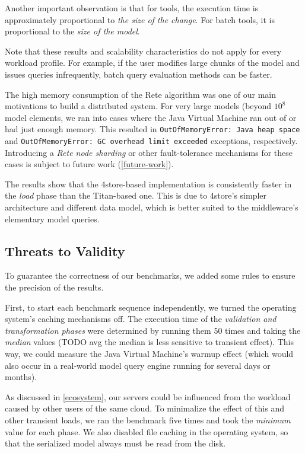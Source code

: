 Another important observation is that for \iqd{} tools, the execution time is approximately proportional to \emph{the size of the change}. For batch tools, it is proportional to the \emph{size of the model}. 

Note that these results and scalability characteristics do not apply for every workload profile. For example, if the user modifies large chunks of the model and issues queries infrequently, batch query evaluation methods can be faster. 

The high memory consumption of the Rete algorithm was one of our main motivations to build a distributed system. For very large models (beyond $10^8$ model elements, we ran into cases where the Java Virtual Machine ran out of or had just enough memory. This resulted in \texttt{OutOfMemoryError: Java heap space} and \texttt{OutOfMemoryError: GC overhead limit exceeded} exceptions, respectively. Introducing a \emph{Rete node sharding} or other fault-tolerance mechanisms for these cases is subject to future work (\autoref{future-work}).

The results show that the 4store-based \iqd{} implementation is consistently faster in the \emph{load} phase than the Titan-based one. This is due to 4store's simpler architecture and different data model, which is better suited to the \iqd{} middleware's elementary model queries.

\subsection{Threats to Validity}
\label{threats-to-validity}

To guarantee the correctness of our benchmarks, we added some rules to ensure the precision of the results.

First, to start each benchmark sequence independently, we turned the operating system's caching mechanisms off. The execution time of the \emph{validation and transformation phases} were determined by running them 50 times and taking the \emph{median} values (TODO avg the median is less sensitive to transient effect). This way, we could measure the Java Virtual Machine's warmup effect (which would also occur in a real-world model query engine running for several days or months).

As discussed in \autoref{ecosystem}, our servers could be influenced from the workload caused by other users of the same cloud. To minimalize the effect of this and other transient loads, we ran the benchmark five times and took the \emph{minimum} value for each phase. We also disabled file caching in the operating system, so that the serialized model always must be read from the disk.


